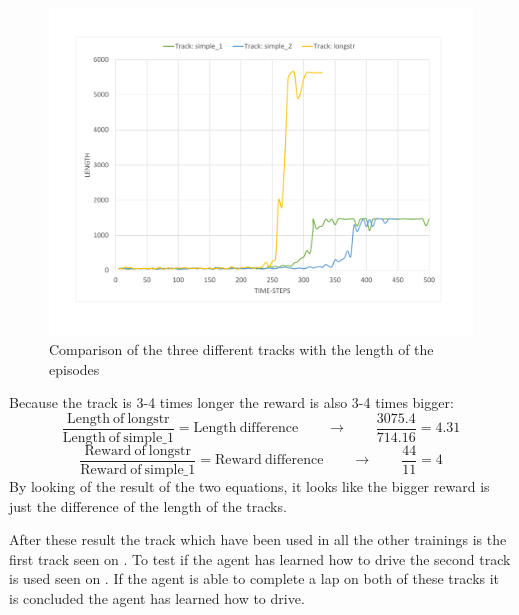 \begin{figure}[H]
	\centering
	\includegraphics[width=1\textwidth]{Figures/Result/change_of_track_length_graph.pdf}
	\caption{Comparison of the three different tracks with the length of the episodes}
	\label{fig:change_of_track_length_graph}
\end{figure}

Because the track is 3-4 times longer the reward is also 3-4 times bigger:
\begin{equation}
\frac{\mathrm{Length \ of \ longstr}}{\mathrm{Length \ of \ simple\_1}} = \mathrm{Length \ difference}   \qquad \rightarrow \qquad \frac{3075.4}{714.16} = 4.31  
\end{equation}
\begin{equation}
\frac{\mathrm{Reward \ of \ longstr}}{\mathrm{Reward \ of \ simple\_1}} = \mathrm{Reward \ difference}   \qquad \rightarrow \qquad \frac{44}{11} = 4
\end{equation}
By looking of the result of the two equations, it looks like the bigger reward is just the difference of the length of the tracks. 


After these result the track which have been used in all the other trainings is the first track seen on . To test if the agent has learned how to drive the second track is used seen on . If the agent is able to complete a lap on both of these tracks it is concluded the agent has learned how to drive.   



